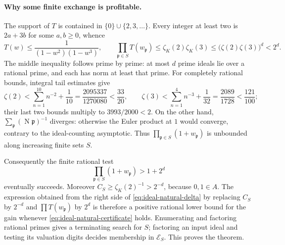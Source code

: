 \paragraph{Why some finite exchange is profitable.}
The support of $T$ is contained in $\{0\}\cup\{2,3,\ldots\}$.
Every integer at least two is $2a+3b$ for some $a,b\ge0$, whence
\[
 T(w)\le\frac1{(1-w^2)(1-w^3)},\qquad
 \prod_{\mathfrak p\in S}T(w_{\mathfrak p})
       \le\zeta_K(2)\zeta_K(3)
       \le\bigl(\zeta(2)\zeta(3)\bigr)^d<2^d.
\]
The middle inequality follows prime by prime: at most $d$ prime ideals
lie over a rational prime, and each has norm at least that prime.
For completely rational bounds, integral tail estimates give
\[
 \zeta(2)<\sum_{n=1}^{10}n^{-2}+\frac1{10}
    =\frac{2095337}{1270080}<\frac{33}{20},\qquad
 \zeta(3)<\sum_{n=1}^{4}n^{-3}+\frac1{32}
    =\frac{2089}{1728}<\frac{121}{100};
\]
their last two bounds multiply to $3993/2000<2$.
On the other hand, $\sum_{\mathfrak p}(\operatorname N\mathfrak p)^{-1}$
diverges: otherwise the Euler product at $1$ would converge, contrary
to the ideal-counting asymptotic. Thus
$\prod_{\mathfrak p\in S}(1+w_{\mathfrak p})$ is unbounded along
increasing finite sets $S$.

Consequently the finite rational test
\begin{equation}\label{eq:ideal-natural-certificate}
                  \prod_{\mathfrak p\in S}(1+w_{\mathfrak p})>1+2^d
\end{equation}
eventually succeeds. Moreover
$C_S\ge\zeta_K(2)^{-1}>2^{-d}$, because $0,1\in A$.
The expression obtained from the right side of
\eqref{eq:ideal-natural-delta} by replacing $C_S$ by $2^{-d}$ and
$\prod T(w_{\mathfrak p})$ by $2^d$ is therefore a positive rational
lower bound for the gain whenever \eqref{eq:ideal-natural-certificate}
holds. Enumerating and factoring rational primes gives a terminating
search for $S$; factoring an input ideal and testing its valuation
digits decides membership in $\mathcal E_S$. This proves the theorem.


